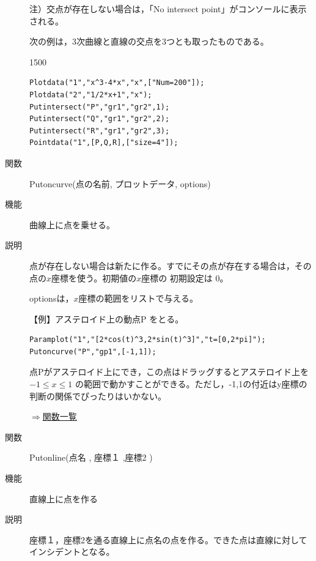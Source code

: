 \documentclass[papersize,a4paper,12pt,uplatex]{jsarticle}
\begin{document}
\begin{description}
注）交点が存在しない場合は，「No intersect point」がコンソールに表示される。

\newpage

次の例は，3次曲線と直線の交点を3つとも取ったものである。

\begin{layer}{150}{0}
\end{layer}

\begin{verbatim}
Plotdata("1","x^3-4*x","x",["Num=200"]);
Plotdata("2","1/2*x+1","x");
Putintersect("P","gr1","gr2",1);
Putintersect("Q","gr1","gr2",2);
Putintersect("R","gr1","gr2",3);
Pointdata("1",[P,Q,R],["size=4"]);
\end{verbatim}


\vspace{\baselineskip}
\hypertarget{putoncurve}{}
\item[関数]Putoncurve(点の名前, プロットデータ, options)
\item[機能]曲線上に点を乗せる。
\item[説明]点が存在しない場合は新たに作る。すでにその点が存在する場合は，その点の$x$座標を使う。初期値の$x$座標の 初期設定は 0。

optionsは，$x$座標の範囲をリストで与える。

\vspace{\baselineskip}
【例】アステロイド上の動点P をとる。
\begin{verbatim}
Paramplot("1","[2*cos(t)^3,2*sin(t)^3]","t=[0,2*pi]");
Putoncurve("P","gp1",[-1,1]); 
\end{verbatim}
点Pがアステロイド上にでき，この点はドラッグするとアステロイド上を $-1 \leq x\leq 1$ の範囲で動かすことができる。ただし，-1,1の付近はy座標の判断の関係でぴったりはいかない。

 \begin{center} \scalebox{0.9}{} \end{center}

\begin{flushright}\hyperlink{functionlist}{$\Rightarrow$関数一覧}\end{flushright}

\hypertarget{putonline}{}
\item[関数]Putonline(点名 , 座標１ ,座標2 )
\item[機能]直線上に点を作る
\item[説明]座標１，座標2を通る直線上に点名の点を作る。できた点は直線に対してインシデントとなる。


\end{description}
\end{document}
